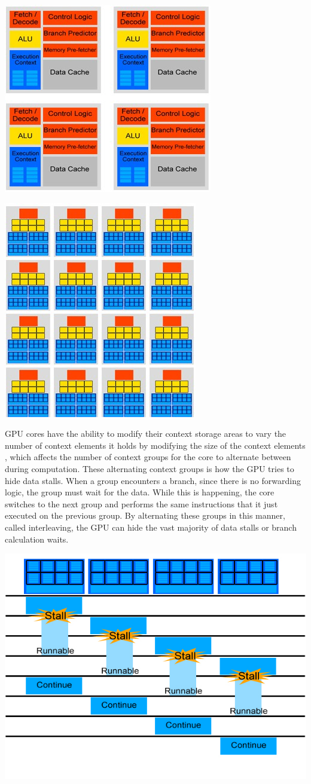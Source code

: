 \documentclass[conference]{IEEEtran}
\begin{document}
\begin{center}
		\includegraphics[width=.2\textwidth]{Multicore-CPU-design.jpg} 
\end{center}

\begin{center}
	\includegraphics[width=.2\textwidth]{GPU-Design---multiple-cores.jpg}
\end{center}

GPU cores have the ability to modify their context storage areas to vary the number of context elements it holds by modifying the size of the context elements \cite{SIG09}, which affects the number of context groups for the core to alternate between during computation.  These alternating context groups is how the GPU tries to hide data stalls.  When a group encounters a branch, since there is no forwarding logic, the group must wait for the data.  While this is happening, the core switches to the next group and performs the same instructions that it just executed on the previous group.  By alternating these groups in this manner, called interleaving, the GPU can hide the vast majority of data stalls or branch calculation waits.

\begin{center}
	\includegraphics[width=.45\textwidth]{GPU-context-interleaving.jpg}
\end{center}
\end{document}
